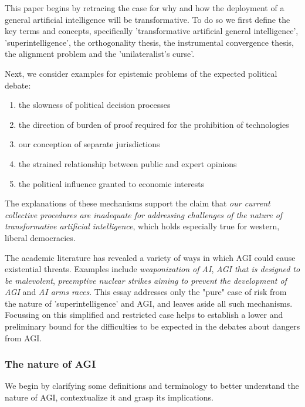 \documentclass[12pt, a4paper]{article}
\begin{document}
			This paper begins by retracing the case for why and how the deployment of a general artificial intelligence will be transformative.
			To do so we first define the key terms and concepts, specifically 'transformative artificial general intelligence', 'superintelligence', the orthogonality thesis, the instrumental convergence thesis, the alignment problem and the 'unilateralist's curse'.
			
			Next, we consider examples for epistemic problems of the expected political debate:
			\begin{enumerate}
				\item the slowness of political decision processes
				\item the direction of burden of proof required for the prohibition of technologies
				\item our conception of separate jurisdictions
				\item the strained relationship between public and expert opinions
				\item the political influence granted to economic interests
			\end{enumerate}
			The explanations of these mechanisms support the claim that \textit{our current collective procedures are inadequate for addressing challenges of the nature of transformative artificial intelligence}, which holds especially true for western, liberal democracies.
			
			The academic literature has revealed a variety of ways in which AGI could cause existential threats.
			Examples include\textit{ weaponization of AI},\textit{ AGI that is designed to be malevolent}, \textit{preemptive nuclear strikes aiming to prevent the development of AGI} and \textit{AI arms races}.
			This essay addresses only the "pure" case of risk from the nature of 'superintelligence' and AGI, and leaves aside all such mechanisms.
			Focussing on this simplified and restricted case helps to establish a lower and preliminary bound for the difficulties to be expected in the debates about dangers from AGI.
			
			
		\subsubsection{The nature of AGI}
			We begin by clarifying some definitions and terminology to better understand the nature of AGI, contextualize it and grasp its implications.
			
\end{document}
